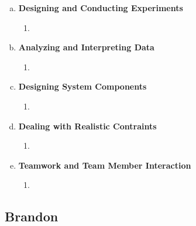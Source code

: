 \documentclass[11pt]{article}   %
\begin{document}
\begin{enumerate} [a)]
\item  {\bf Designing and Conducting Experiments}
\begin{enumerate} [$\cdot$]
\item 
\end{enumerate}
\item  {\bf Analyzing and Interpreting Data}
\begin{enumerate} [$\cdot$]
\item  
\end{enumerate}
\item {\bf Designing System Components}
\begin{enumerate} [$\cdot$]
\item 
\end{enumerate}
\item {\bf Dealing with Realistic Contraints}
\begin{enumerate} [$\cdot$]
\item 
\end{enumerate}
\item  {\bf Teamwork and Team Member Interaction}
\begin{enumerate} [$\cdot$]
\item 
\end{enumerate}
\end{enumerate}

\subsection*{Brandon}
\end{document}
